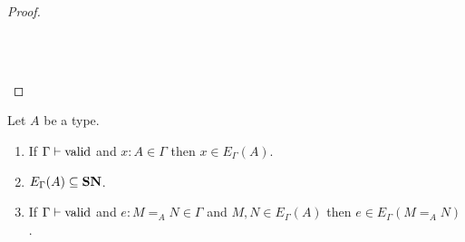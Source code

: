 \begin{proof}
{\begin{code}
\\
%
\\
\> \AgdaSymbol{(}  \AgdaSymbol{(}    \AgdaSymbol{\_}  \AgdaSymbol{))} \AgdaSymbol{=}    \AgdaSymbol{(} \AgdaSymbol{)}\<%
\end{code}
}
\end{proof}

\begin{lemma}
\label{lm:varcompute2}
Let $A$ be a type.
\begin{enumerate}
\item
If $\Gamma \vdash \mathrm{valid}$ and $x : A \in \Gamma$ then $x \in E_\Gamma(A)$.

\begin{code}%
\>  \AgdaSymbol{:}  \AgdaSymbol{\{}\AgdaSymbol{\}} \AgdaSymbol{\{} \AgdaSymbol{:}  \AgdaSymbol{\}} \AgdaSymbol{\{} \AgdaSymbol{:}   \AgdaSymbol{\}}       \AgdaSymbol{(}  \AgdaSymbol{)} \AgdaSymbol{(} \AgdaSymbol{)}\<%
\end{code}
\item
$E_\Gamma(A) \subseteq \mathbf{SN}$.

\begin{code}%
\>  \AgdaSymbol{:}  \AgdaSymbol{\{}\AgdaSymbol{\}} \AgdaSymbol{\{} \AgdaSymbol{:}  \AgdaSymbol{\}} \AgdaSymbol{\{}\AgdaSymbol{\}} \AgdaSymbol{\{} \AgdaSymbol{:}  \AgdaSymbol{\}}    \AgdaSymbol{(} \AgdaSymbol{)}    \<%
\end{code}
\item
If $\Gamma \vdash \mathrm{valid}$ and $e : M =_A N \in \Gamma$ and $M, N \in E_\Gamma(A)$ then $e \in E_\Gamma(M =_A N)$.


\end{enumerate}
\end{lemma}
